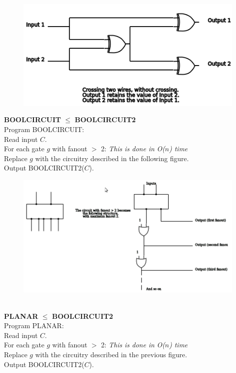 \documentclass[10pt]{article}
\newcommand{\tab}{\hspace*{2em}}
\newcommand{\tabb}{\hspace*{4em}}
\begin{document}
\begin{figure}[h]
	\centering
		\includegraphics[width=450px]{red6cross.png}
\end{figure}
	\newpage
	\textbf{BOOLCIRCUIT} $\leq$ \textbf{BOOLCIRCUIT2}\\
	Program BOOLCIRCUIT:\\
	\tab Read input $C$.\\
	\tab For each gate $g$ with fanout $>$ 2: \emph{This is done in O($n$) time}\\
	\tabb Replace $g$ with the circuitry described in the following figure.\\
	\tab Output BOOLCIRCUIT2($C$).\\
\begin{figure}[h]
	\centering
		\includegraphics[width=450px]{red6fanout.png}
\end{figure}
	\\
	\textbf{PLANAR} $\leq$ \textbf{BOOLCIRCUIT2}\\
	Program PLANAR:\\
	\tab Read input $C$.\\
	\tab For each gate $g$ with fanout $>$ 2: \emph{This is done in O($n$) time}\\
	\tabb Replace $g$ with the circuitry described in the previous figure.\\
	\tab Output BOOLCIRCUIT2($C$).\\
\end{document}
